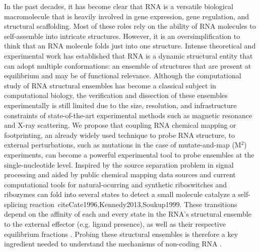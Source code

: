 \documentclass[12pt]{article}
\begin{document}
In the past decades, it has become clear that RNA is a versatile biological macromolecule that is heavily involved in gene expression, gene regulation, and structural scaffolding. Most of these roles rely on the ability of RNA molecules to self-assemble into intricate structures. However, it is an oversimplification to think that an RNA molecule folds just into one structure. Intense theoretical and experimental work has established that RNA is a dynamic structural entity that can adopt multiple conformations: an ensemble of structures that are present at equilibrium and may be of functional relevance. Although the computational study of RNA structural ensembles has become a classical subject in computational biology, the verification and dissection of these ensembles experimentally is still limited due to the size, resolution, and infrastructure constraints of state-of-the-art experimental methods such as magnetic resonance and X-ray scattering. We propose that coupling RNA chemical mapping or footprinting, an already widely used technique to probe RNA structure, to external perturbations, such as mutations in the case of mutate-and-map (M$^2$) experiments, can become a powerful experimental tool to probe ensembles at the single-nucleotide level. Inspired by the source separation problem in signal processing and aided by public chemical mapping data sources and current computational tools for natural-ocurring and synthetic riboswitches and ribozymes can fold into several states to detect a small molecule  \cite{Mandal2004,Winkler2003} catalyze a self-splicing reaction\ cite{Cate1996,Kennedy2013,Soukup1999}. These transitions depend on the affinity of each and every state in the RNA's structural ensemble to the external effector (e.g. ligand presence), as well as their respective equilibrium fractions \cite{Reining2013}. Probing these structural ensembles is therefore a key ingredient needed to understand the mechanisms of non-coding RNA \cite{Reining2013,Villordo2010}. 
\end{document}
